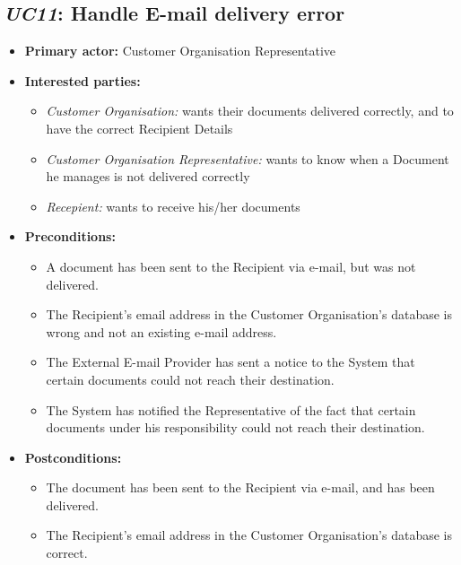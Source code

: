 \documentclass[a4paper,10pt]{article}
\begin{document}
\subsection{\emph{UC11}: Handle E-mail delivery error}
\begin{itemize}
    \item \textbf{Primary actor:} Customer Organisation Representative
    \item \textbf{Interested parties:} 
        \begin{itemize}
            \item \textit{Customer Organisation:} wants their documents delivered correctly, and to have the correct Recipient Details
            \item \textit{Customer Organisation Representative:} wants to know when a Document he manages is not delivered correctly
            \item \textit{Recepient:} wants to receive his/her documents
        \end{itemize}

    \item \textbf{Preconditions:}
        \begin{itemize}
            \item A document has been sent to the Recipient via e-mail, but was not delivered.
            \item The Recipient's email address in the Customer Organisation's database is wrong and not an existing e-mail address.
            \item The External E-mail Provider has sent a notice to the System that certain documents could not reach their destination.
            \item The System has notified the Representative of the fact that certain documents under his responsibility could not reach their destination.
        \end{itemize}

    \item \textbf{Postconditions:}
        \begin{itemize}
            \item The document has been sent to the Recipient via e-mail, and has been delivered.
            \item The Recipient's email address in the Customer Organisation's database is correct.
        \end{itemize}
        

\end{itemize}
\end{document}
